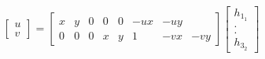 \begin{equation}
    \label{Regressor}
  \begin{bmatrix}
  u\\ 
  v
  \end{bmatrix}
        = 
       \begin{bmatrix}
 x & y & 0 & 0 & 0 & -ux & -uy \\
 0 & 0 & 0 & x & y & 1 & -vx & -vy
  \end{bmatrix}
  \begin{bmatrix}
  h_1_1\\ 
    .\\
    .\\
  h_3_2
  \end{bmatrix}
      \end{equation}